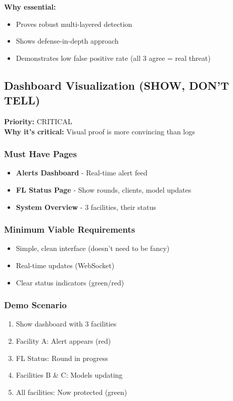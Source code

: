\documentclass[11pt,a4paper]{article}
\begin{document}
\textbf{Why essential:}
\begin{itemize}[leftmargin=*]
    \item Proves robust multi-layered detection
    \item Shows defense-in-depth approach
    \item Demonstrates low false positive rate (all 3 agree = real threat)
\end{itemize}


\subsection{Dashboard Visualization (SHOW, DON'T TELL)}

\textbf{Priority:} \textcolor{critical}{CRITICAL} \\
\textbf{Why it's critical:} Visual proof is more convincing than logs

\subsubsection{Must Have Pages}

\begin{itemize}[leftmargin=*]
    \item \textbf{Alerts Dashboard} - Real-time alert feed
    \item \textbf{FL Status Page} - Show rounds, clients, model updates
    \item \textbf{System Overview} - 3 facilities, their status
\end{itemize}

\subsubsection{Minimum Viable Requirements}

\begin{itemize}[leftmargin=*]
    \item Simple, clean interface (doesn't need to be fancy)
    \item Real-time updates (WebSocket)
    \item Clear status indicators (green/red)
\end{itemize}

\subsubsection{Demo Scenario}

\begin{enumerate}[leftmargin=*]
    \item Show dashboard with 3 facilities
    \item Facility A: Alert appears (red)
    \item FL Status: Round in progress
    \item Facilities B \& C: Models updating
    \item All facilities: Now protected (green)
\end{enumerate}
\end{document}
